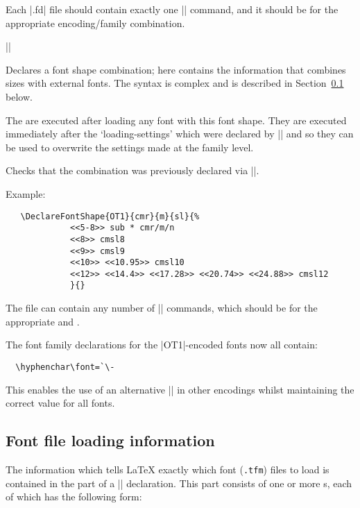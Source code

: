 \documentclass{ltxguide}[1995/11/28]
\begin{document}
Each |.fd| file should contain exactly one |\DeclareFontFamily|
command, and it should be for the appropriate encoding/family
combination.
 
\begin{decl}
|\DeclareFontShape|   
                    \\
        \null\hfill {} 
\end{decl}
 
Declares a font shape combination; here  contains the
information that combines sizes with external fonts. The syntax is
complex and is described in Section~\ref{sec:loadinfo} below.
 
The  are executed after loading any font with this
font shape.  They are executed immediately after the
`loading-settings' which were declared by |\DeclareFontFamily| and so
they can be used to overwrite the settings made at the family level.
 
Checks that the combination  was previously
declared via |\DeclareFontFamily|.
 
Example:
\begin{verbatim}
   \DeclareFontShape{OT1}{cmr}{m}{sl}{%
             <<5-8>> sub * cmr/m/n
             <<8>> cmsl8
             <<9>> cmsl9
             <<10>> <<10.95>> cmsl10
             <<12>> <<14.4>> <<17.28>> <<20.74>> <<24.88>> cmsl12
             }{}
\end{verbatim}
The file can contain any number of |\DeclareFontShape| commands,
which should be for the appropriate  and .
 
The font family declarations for the |OT1|-encoded fonts now all
contain:
\begin{verbatim}
  \hyphenchar\font=`\-
\end{verbatim}
This enables the use of an alternative |\hyphenchar| in other encodings
whilst maintaining the correct value for all fonts.

\subsection{Font file loading information}
\label{sec:loadinfo}
 
The information which tells \LaTeX{} exactly which font ({\tt .tfm})
files to load is contained in the  part of a
|\DeclareFontShape| declaration. This part consists of one or more
s, each of which has the following form:
 
\end{document}

